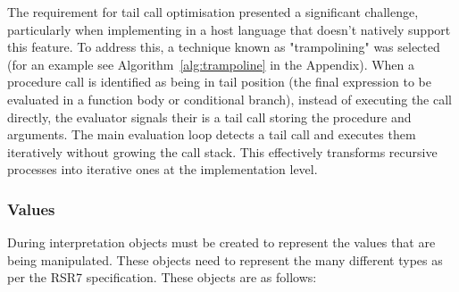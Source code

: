\documentclass[final]{cmpreport_02}
\begin{document}
The requirement for tail call optimisation presented a significant challenge, particularly when implementing in a host language that doesn't natively support this feature. To address this, a technique known as "trampolining" was selected (for an example see Algorithm~\ref{alg:trampoline} in the Appendix). When a procedure call is identified as being in tail position (the final expression to be evaluated in a function body or conditional branch), instead of executing the call directly, the evaluator signals their is a tail call storing the procedure and arguments. The main evaluation loop detects a tail call and executes them iteratively without growing the call stack. This effectively transforms recursive processes into iterative ones at the implementation level.

\subsubsection{Values}
During interpretation objects must be created to represent the values that are being manipulated. These objects need to represent the many different types as per the RSR7 specification. These objects are as follows:
\end{document}
